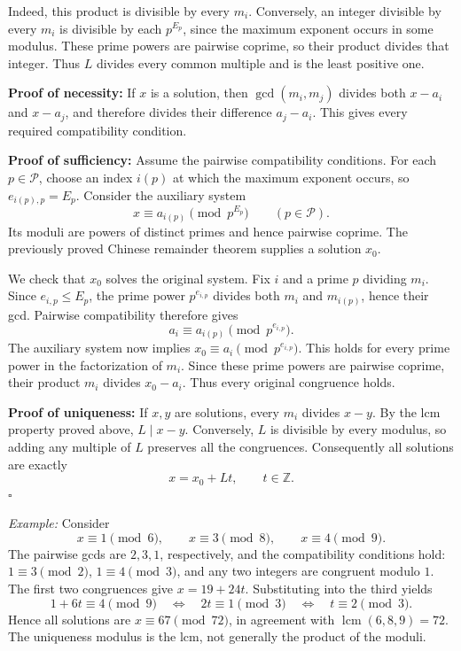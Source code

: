 \documentclass[a4paper,11pt,abstracton]{scrartcl}
\theoremstyle{dotlessP}
\theoremstyle{dotlessS}
\theoremstyle{remark}
\theoremstyle{definition}
\begin{document}
Indeed, this product is divisible by every $m_i$. Conversely, an
integer divisible by every $m_i$ is divisible by each $p^{E_p}$,
since the maximum exponent occurs in some modulus. These prime powers
are pairwise coprime, so their product divides that integer.
Thus $L$ divides every common multiple and is the least positive one.

\textbf{Proof of necessity:}
If $x$ is a solution, then $\gcd(m_i,m_j)$ divides both $x-a_i$
and $x-a_j$, and therefore divides their difference $a_j-a_i$.
This gives every required compatibility condition.


\textbf{Proof of sufficiency:}
Assume the pairwise compatibility conditions. For each
$p\in\mathcal{P}$, choose an index $i(p)$ at which the maximum
exponent occurs, so $e_{i(p),p}=E_p$. Consider the auxiliary system
\[
    x\equiv a_{i(p)}\pmod{p^{E_p}}
    \qquad(p\in\mathcal{P}).
\]
Its moduli are powers of distinct primes and hence pairwise coprime.
The previously proved Chinese remainder theorem supplies a solution $x_0$.

We check that $x_0$ solves the original system. Fix $i$ and a prime
$p$ dividing $m_i$. Since $e_{i,p}\leq E_p$, the prime power
$p^{e_{i,p}}$ divides both $m_i$ and $m_{i(p)}$, hence their gcd.
Pairwise compatibility therefore gives
\[
    a_i\equiv a_{i(p)}\pmod{p^{e_{i,p}}}.
\]
The auxiliary system now implies $x_0\equiv a_i\pmod{p^{e_{i,p}}}$.
This holds for every prime power in the factorization of $m_i$.
Since these prime powers are pairwise coprime, their product $m_i$
divides $x_0-a_i$. Thus every original congruence holds.


\textbf{Proof of uniqueness:}
If $x,y$ are solutions, every $m_i$ divides $x-y$. By the lcm property
proved above, $L\mid x-y$. Conversely, $L$ is divisible by every
modulus, so adding any multiple of $L$ preserves all the congruences.
Consequently all solutions are exactly
\[
    \boxed{x=x_0+Lt,\qquad t\in\mathbb{Z}.}
\]
\hfill$\square$



\begin{example_box}
\textit{Example:}
Consider
\[
    x\equiv1\pmod6,\qquad x\equiv3\pmod8,\qquad x\equiv4\pmod9.
\]
The pairwise gcds are $2,3,1$, respectively, and the compatibility
conditions hold: $1\equiv3\pmod2$, $1\equiv4\pmod3$, and any two
integers are congruent modulo $1$.
The first two congruences give $x=19+24t$.
Substituting into the third yields
\[
    1+6t\equiv4\pmod9
    \quad\Longleftrightarrow\quad
    2t\equiv1\pmod3
    \quad\Longleftrightarrow\quad t\equiv2\pmod3.
\]
Hence all solutions are $x\equiv67\pmod{72}$, in agreement with
$\operatorname{lcm}(6,8,9)=72$.
The uniqueness modulus is the lcm, not generally the product of the moduli.
\end{example_box}
\end{document}
